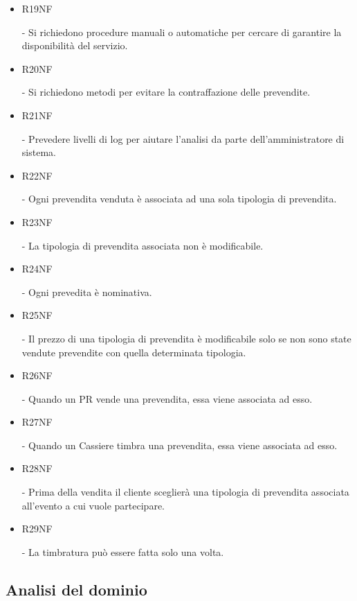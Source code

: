 \documentclass[a4paper]{article}
\begin{document}
\begin{itemize}
	\item \hypertarget{R19NF}{R19NF} - Si richiedono procedure manuali o automatiche per cercare di garantire la disponibilità del servizio.
	
	\item \hypertarget{R20NF}{R20NF} - Si richiedono metodi per evitare la contraffazione delle prevendite.
	
	\item \hypertarget{R21NF}{R21NF} - Prevedere livelli di log per aiutare l'analisi da parte dell'amministratore di sistema.
	
	\item \hypertarget{R22NF}{R22NF} - Ogni prevendita venduta è associata ad una sola tipologia di prevendita.
	\item \hypertarget{R23NF}{R23NF} - La tipologia di prevendita associata non è modificabile.
	\item \hypertarget{R24NF}{R24NF} - Ogni prevedita è nominativa.
	
	\item \hypertarget{R25NF}{R25NF} - Il prezzo di una tipologia di prevendita è modificabile solo se non sono state vendute prevendite con quella determinata tipologia.
	
	\item \hypertarget{R26NF}{R26NF} - Quando un PR vende una prevendita, essa viene associata ad esso.
	\item \hypertarget{R27NF}{R27NF} - Quando un Cassiere timbra una prevendita, essa viene associata ad esso.
	
	\item \hypertarget{R6NF}{R28NF} - Prima della vendita il cliente sceglierà una tipologia di prevendita associata all'evento a cui vuole partecipare.
	
	\item \hypertarget{R29NF}{R29NF} - La timbratura può essere fatta solo una volta.
	
	
\end{itemize}

\newpage

\subsection{Analisi del dominio}
\end{document}
